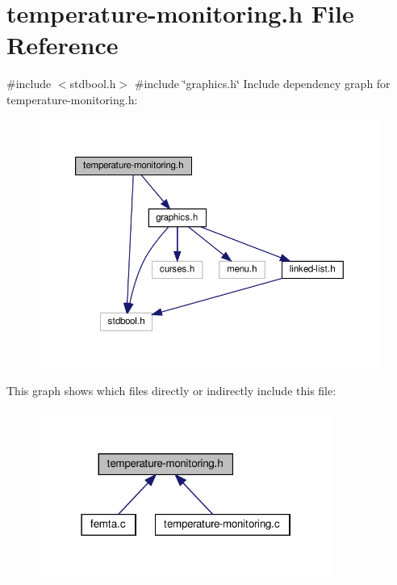 \hypertarget{temperature-monitoring_8h}{}\section{temperature-\/monitoring.h File Reference}
\label{temperature-monitoring_8h}
{\ttfamily \#include $<$stdbool.\+h$>$}\newline
{\ttfamily \#include \char`\"{}graphics.\+h\char`\"{}}\newline
Include dependency graph for temperature-\/monitoring.h\+:\nopagebreak
\begin{figure}[H]
\begin{center}
\leavevmode
\includegraphics[width=350pt]{temperature-monitoring_8h__incl}
\end{center}
\end{figure}
This graph shows which files directly or indirectly include this file\+:\nopagebreak
\begin{figure}[H]
\begin{center}
\leavevmode
\includegraphics[width=274pt]{temperature-monitoring_8h__dep__incl}
\end{center}
\end{figure}
